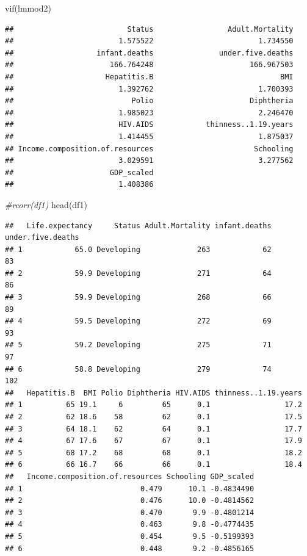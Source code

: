 \documentclass[
]{article}
\newenvironment{Shaded}{\begin{snugshade}}{\end{snugshade}}
\newcommand{\CommentTok}[1]{\textcolor[rgb]{0.56,0.35,0.01}{\textit{#1}}}
\newcommand{\FunctionTok}[1]{\textcolor[rgb]{0.00,0.00,0.00}{#1}}
\newcommand{\NormalTok}[1]{#1}
\begin{document}
\begin{Shaded}
\begin{Highlighting}[]
\FunctionTok{vif}\NormalTok{(lmmod2)}
\end{Highlighting}
\end{Shaded}

\begin{verbatim}
##                          Status                 Adult.Mortality 
##                        1.575522                        1.734550 
##                   infant.deaths               under.five.deaths 
##                      166.764248                      166.967503 
##                     Hepatitis.B                             BMI 
##                        1.392762                        1.700393 
##                           Polio                      Diphtheria 
##                        1.985023                        2.246470 
##                        HIV.AIDS            thinness..1.19.years 
##                        1.414455                        1.875037 
## Income.composition.of.resources                       Schooling 
##                        3.029591                        3.277562 
##                      GDP_scaled 
##                        1.408386
\end{verbatim}

\begin{Shaded}
\begin{Highlighting}[]
\CommentTok{\#rcorr(df1)}
\FunctionTok{head}\NormalTok{(df1)}
\end{Highlighting}
\end{Shaded}

\begin{verbatim}
##   Life.expectancy     Status Adult.Mortality infant.deaths under.five.deaths
## 1            65.0 Developing             263            62                83
## 2            59.9 Developing             271            64                86
## 3            59.9 Developing             268            66                89
## 4            59.5 Developing             272            69                93
## 5            59.2 Developing             275            71                97
## 6            58.8 Developing             279            74               102
##   Hepatitis.B  BMI Polio Diphtheria HIV.AIDS thinness..1.19.years
## 1          65 19.1     6         65      0.1                 17.2
## 2          62 18.6    58         62      0.1                 17.5
## 3          64 18.1    62         64      0.1                 17.7
## 4          67 17.6    67         67      0.1                 17.9
## 5          68 17.2    68         68      0.1                 18.2
## 6          66 16.7    66         66      0.1                 18.4
##   Income.composition.of.resources Schooling GDP_scaled
## 1                           0.479      10.1 -0.4834490
## 2                           0.476      10.0 -0.4814562
## 3                           0.470       9.9 -0.4801214
## 4                           0.463       9.8 -0.4774435
## 5                           0.454       9.5 -0.5199393
## 6                           0.448       9.2 -0.4856165
\end{verbatim}
\end{document}
